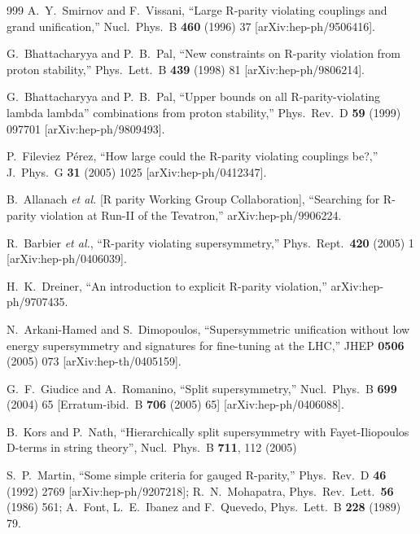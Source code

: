 \begin{thebibliography}{999}
  A.~Y.~Smirnov and F.~Vissani,
  ``Large R-parity violating couplings and grand unification,''
  Nucl.\ Phys.\ B {\bf 460} (1996) 37
  [arXiv:hep-ph/9506416].

  G.~Bhattacharyya and P.~B.~Pal,
  ``New constraints on R-parity violation from proton stability,''
  Phys.\ Lett.\ B {\bf 439} (1998) 81
  [arXiv:hep-ph/9806214].

  G.~Bhattacharyya and P.~B.~Pal,
  ``Upper bounds on all R-parity-violating lambda lambda'' combinations  from
  proton stability,''
  Phys.\ Rev.\ D {\bf 59} (1999) 097701
  [arXiv:hep-ph/9809493].

  P.~Fileviez~P\'erez,
  ``How large could the R-parity violating couplings be?,''
  J.\ Phys.\ G {\bf 31} (2005) 1025
  [arXiv:hep-ph/0412347].

  B.~Allanach {\it et al.}  [R parity Working Group Collaboration],
  ``Searching for R-parity violation at Run-II of the Tevatron,''
  arXiv:hep-ph/9906224.

  R.~Barbier {\it et al.},
  ``R-parity violating supersymmetry,''
  Phys.\ Rept.\  {\bf 420} (2005) 1
  [arXiv:hep-ph/0406039].

  H.~K.~Dreiner,
  ``An introduction to explicit R-parity violation,''
  arXiv:hep-ph/9707435.

  N.~Arkani-Hamed and S.~Dimopoulos,
  ``Supersymmetric unification without low energy supersymmetry and signatures
  for fine-tuning at the LHC,''
  JHEP {\bf 0506} (2005) 073
  [arXiv:hep-th/0405159].

  G.~F.~Giudice and A.~Romanino,
  ``Split supersymmetry,''
  Nucl.\ Phys.\ B {\bf 699} (2004) 65
  [Erratum-ibid.\ B {\bf 706} (2005) 65]
  [arXiv:hep-ph/0406088].

 B.~Kors and P.~Nath,
  ``Hierarchically split supersymmetry with Fayet-Iliopoulos D-terms in string
  theory'',
  Nucl.\ Phys.\ B {\bf 711}, 112 (2005)

  S.~P.~Martin,
  ``Some simple criteria for gauged R-parity,''
  Phys.\ Rev.\ D {\bf 46} (1992) 2769
  [arXiv:hep-ph/9207218];
R.~N.~Mohapatra,
  Phys.\ Rev.\ Lett.\  {\bf 56} (1986) 561;
  A.~Font, L.~E.~Ibanez and F.~Quevedo,
  Phys.\ Lett.\ B {\bf 228} (1989) 79.



\end{thebibliography}
